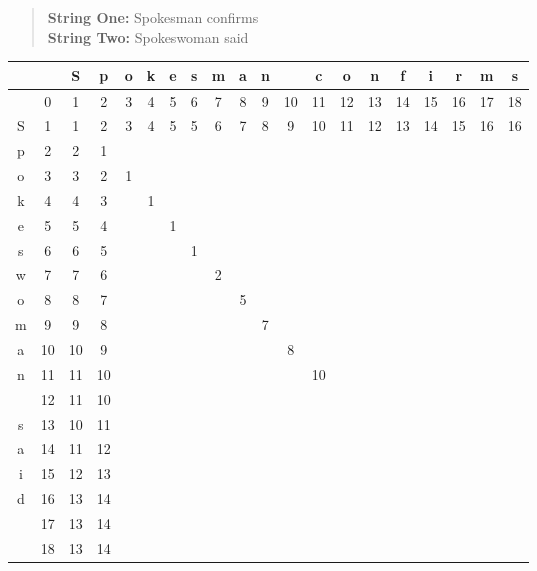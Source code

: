 
\begin{quote}
\textbf{String One: } Spokesman confirms \\
\textbf{String Two: } Spokeswoman said
\end{quote}
\begin{tabular}{||c|c c c c c c c c c c c c c c c c c c c|}
\hline
  &   & S & p & o & k & e & s & m & a & n &   & c & o & n & f & i & r & m & s\\
\hline
\hline
  & 0  & 1  & 2  & 3  & 4  &  5 & 6  & 7  & 8  & 9  & 10 & 11 & 12 & 13 & 14 & 15 & 16 & 17 & 18 \\
S & 1  & 1  & 2  & 3  & 4  & 5  & 5  & 6  & 7  & 8  & 9  & 10 & 11 & 12 & 13 & 14 & 15 & 16 & 16 \\
p & 2  & 2  & 1  &    &    &    &    &    &    &    &    &    &    &    &    &    &    &    &    \\
o & 3  & 3  & 2  & 1  &    &    &    &    &    &    &    &    &    &    &    &    &    &    &    \\
k & 4  & 4  & 3  &    & 1  &    &    &    &    &    &    &    &    &    &    &    &    &    &    \\
e & 5  & 5  & 4  &    &    & 1  &    &    &    &    &    &    &    &    &    &    &    &    &    \\
s & 6  & 6  & 5  &    &    &    & 1  &    &    &    &    &    &    &    &    &    &    &    &    \\
w & 7  & 7  & 6  &    &    &    &    & 2  &    &    &    &    &    &    &    &    &    &    &    \\
o & 8  & 8  & 7  &    &    &    &    &    & 5  &    &    &    &    &    &    &    &    &    &    \\
m & 9  & 9  & 8  &    &    &    &    &    &    & 7  &    &    &    &    &    &    &    &    &    \\
a & 10 & 10 & 9  &    &    &    &    &    &    &    &  8 &    &    &    &    &    &    &    &    \\
n & 11 & 11 & 10 &    &    &    &    &    &    &    &    & 10 &    &    &    &    &    &    &    \\
  & 12 & 11 & 10 &    &    &    &    &    &    &    &    &    &    &    &    &    &    &    &    \\
s & 13 & 10 & 11 &    &    &    &    &    &    &    &    &    &    &    &    &    &    &    &    \\
a & 14 & 11 & 12 &    &    &    &    &    &    &    &    &    &    &    &    &    &    &    &    \\
i & 15 & 12 & 13 &    &    &    &    &    &    &    &    &    &    &    &    &    &    &    &    \\
d & 16 & 13 & 14 &    &    &    &    &    &    &    &    &    &    &    &    &    &    &    &    \\
  & 17 & 13 & 14 &    &    &    &    &    &    &    &    &    &    &    &    &    &    &    &    \\
  & 18 & 13 & 14 &    &    &    &    &    &    &    &    &    &    &    &    &    &    &    &    \\
  \hline

\end{tabular}
